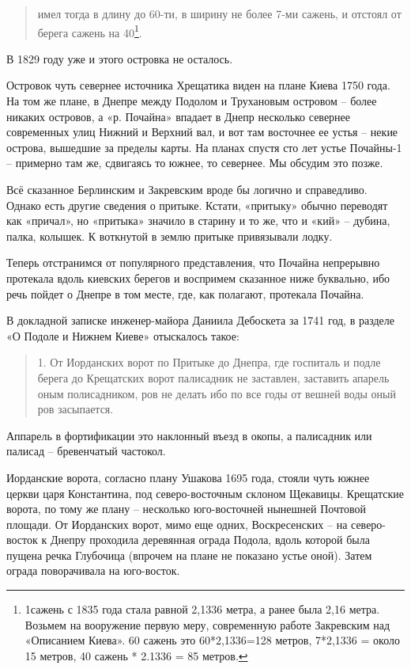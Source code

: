 \begin{quotation}
имел тогда в длину до 60-ти, в ширину не более 7-ми сажень, и отстоял от берега сажень на 40\footnote{1сажень с 1835 года стала равной 2,1336 метра, а ранее была 2,16 метра. Возьмем на вооружение первую меру, современную работе Закревским над «Описанием Киева». 60 сажень это 60*2,1336=128 метров, 7*2,1336 = около 15 метров, 40 сажень * 2.1336 = 85 метров.}.
\end{quotation}

В 1829 году уже и этого островка не осталось.

Островок чуть севернее источника Хрещатика виден на плане Киева 1750 года. На том же плане, в Днепре между Подолом и Трухановым островом – более никаких островов, а «р. Почайна» впадает в Днепр несколько севернее современных улиц Нижний и Верхний вал, и вот там восточнее ее устья – некие острова, вышедшие за пределы карты. На планах спустя сто лет устье Почайны-1 – примерно там же, сдвигаясь то южнее, то севернее. Мы обсудим это позже.

Всё сказанное Берлинским и Закревским вроде бы логично и справедливо. Однако есть другие сведения о притыке. Кстати, «притыку» обычно переводят как «причал», но «притыка» значило в старину и то же, что и «кий» – дубина, палка, колышек. К воткнутой в землю притыке привязывали лодку.

Теперь отстранимся от популярного представления, что Почайна непрерывно протекала вдоль киевских берегов и воспримем сказанное ниже буквально, ибо речь пойдет о Днепре в том месте, где, как полагают, протекала Почайна.

В докладной записке инженер-майора Даниила Дебоскета за 1741 год, в разделе «О Подоле и Нижнем Киеве» отыскалось такое:

\begin{quotation}
1. От Иорданских ворот по Притыке до Днепра, где госпиталь и подле берега до Крещатских ворот палисадник не заставлен, заставить апарель оным полисадником, ров не делать ибо по все годы от вешней воды оный ров засыпается.
\end{quotation}

Аппарель в фортификации это наклонный въезд в окопы, а палисадник или палисад – бревенчатый частокол.

Иорданские ворота, согласно плану Ушакова 1695 года, стояли чуть южнее церкви царя Константина, под северо-восточным склоном Щекавицы. Крещатские ворота, по тому же плану – несколько юго-восточней нынешней Почтовой площади. От Иорданских ворот, мимо еще одних, Воскресенских – на северо-восток к Днепру проходила деревянная ограда Подола, вдоль которой была пущена речка Глубочица (впрочем на плане не показано устье оной). Затем ограда поворачивала на юго-восток.

